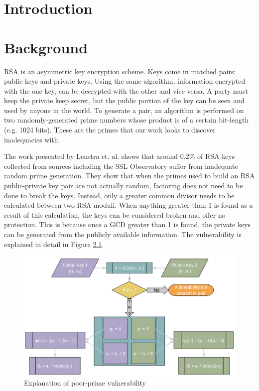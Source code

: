 \documentclass[12pt]{ucthesis}
\begin{document}
\pagestyle{plain}
\renewcommand{\baselinestretch}{1.66}


\chapter{Introduction}
\label{introduction}


\chapter{Background}
\label{background}
RSA is an asymmetric key encryption scheme. Keys come in matched pairs:
public keys and private keys. Using the same algorithm, information encrypted
with the one key, can be decrypted with the other and vice versa. A party must
keep the private keep secret, but the public portion of the key can be seen and
used by anyone in the world. To generate a pair, an algorithm is performed on
two randomly-generated prime numbers whose product is of a certain bit-length
(e.g. 1024 bits). These are the primes that our work looks to discover
inadequacies with.

The work presented by Lenstra et. al. \cite{lenstra2012ron} shows that around
0.2\% of RSA keys collected from sources including the SSL Observatory suffer
from inadequate random prime generation. They show that when the primes used to
build an RSA public-private key pair are not actually random, factoring does
not need to be done to break the keys. Instead, only a greater common divisor
needs to be calculated between two RSA moduli. When anything greater than 1 is
found as a result of this calculation, the keys can be considered broken and
offer no protection. This is because once a GCD greater than 1 is found, the
private keys can be generated from the publicly available information. The
vulnerability is explained in detail in Figure \ref{fig:vuln}.

\begin{figure}
   \centering
   \includegraphics[width=\linewidth]{vulnerability.png}
   \caption{Explanation of poor-prime vulnerability}
   \label{fig:vuln}
\end{figure}
\end{document}

